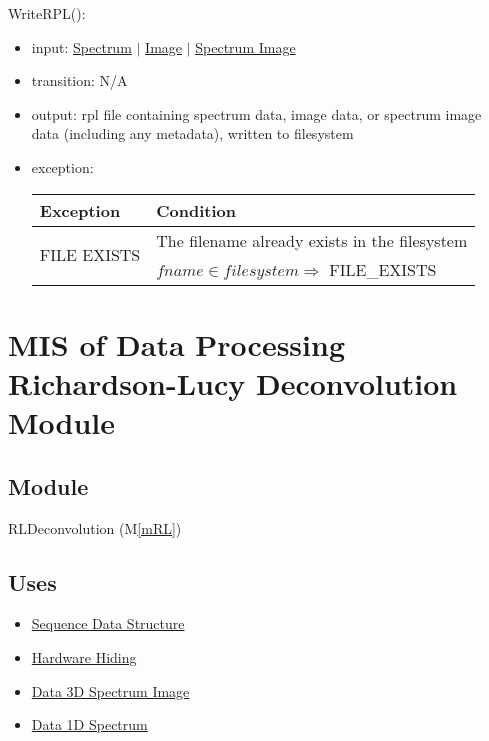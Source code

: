 \documentclass[12pt, titlepage]{article}
\newcommand{\mref}[1]{M\ref{#1}}
\begin{document}
\noindent WriteRPL():
\begin{itemize}
    \item input: \hyperref[Mod:Spectrum]{Spectrum} $|$
    \hyperref[Mod:Image]{Image} $|$ \hyperref[Mod:SI]{Spectrum Image}
    \item transition: N/A
    \item output: rpl file containing spectrum data, image data, or spectrum
    image data (including any metadata), written to filesystem
    \item exception:
    \begin{center}
        \begin{tabular}{p{3cm} p{12cm}}
            \toprule[0.15em]
            \textbf{Exception} & \textbf{Condition}\\
            \midrule[0.1em]
            \multirow{2}{0.25\textwidth}{FILE EXISTS} & The filename already
            exists in the filesystem\\ 
            & $fname \in filesystem \Rightarrow$ FILE\_EXISTS\\ 
            \bottomrule[0.15em]
        \end{tabular}
    \end{center}
\end{itemize}

\newpage
\section{MIS of Data Processing Richardson-Lucy Deconvolution Module}
\label{Mod: RLDeconvolution}

\subsection{Module}

RLDeconvolution (\mref{mRL})

\subsection{Uses}
\begin{itemize}
    \item \hyperref[Mod:Seq]{Sequence Data Structure}
    \item \hyperref[Mod:HH]{Hardware Hiding}
    \item \hyperref[Mod:SI]{Data 3D Spectrum Image}
    \item \hyperref[Mod:Spectrum]{Data 1D Spectrum}
\end{itemize}
\end{document}
